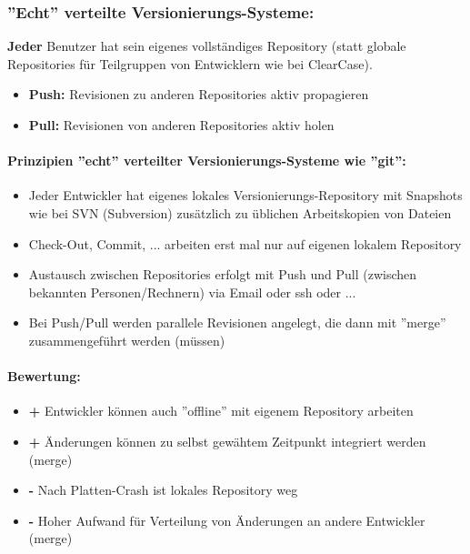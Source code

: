 \subsubsection{''Echt'' verteilte Versionierungs-Systeme:}
\textbf{Jeder} Benutzer hat sein eigenes vollständiges Repository (statt globale Repositories für Teilgruppen von Entwicklern wie bei ClearCase).
\begin{itemize}
	\item \textbf{Push:} Revisionen zu anderen Repositories aktiv propagieren
	\item \textbf{Pull:} Revisionen von anderen Repositories aktiv holen
\end{itemize}
\paragraph{Prinzipien ''echt'' verteilter Versionierungs-Systeme wie ''git'':}
\begin{itemize}
	\item Jeder Entwickler hat eigenes lokales Versionierungs-Repository mit Snapshots wie bei SVN (Subversion) zusätzlich zu  üblichen Arbeitskopien von Dateien
	\item Check-Out, Commit, ... arbeiten erst mal nur auf eigenen lokalem Repository
	\item Austausch zwischen Repositories erfolgt mit Push und Pull (zwischen bekannten Personen/Rechnern) via Email oder ssh oder ... 
	\item Bei Push/Pull werden parallele Revisionen angelegt, die dann mit ''merge'' zusammengeführt werden (müssen) 
\end{itemize}
\paragraph{Bewertung:}
\begin{itemize}
	\item \textbf{+} Entwickler können auch ''offline'' mit eigenem Repository arbeiten
	\item \textbf{+} Änderungen können zu selbst gewähtem Zeitpunkt integriert werden (merge)
	\item \textbf{-} Nach Platten-Crash ist lokales Repository weg
	\item \textbf{-} Hoher Aufwand für Verteilung von Änderungen an andere Entwickler (merge)
\end{itemize}
